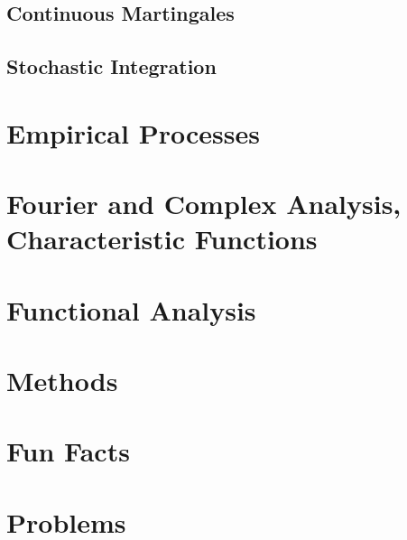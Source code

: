 \documentclass[12pt, oneside]{book}
\begin{document}
        \section{Continuous Martingales}
        \section{Stochastic Integration}
    \chapter{Empirical Processes}
    \appendix
    \chapter{Fourier and Complex Analysis, Characteristic Functions}
    \chapter{Functional Analysis}
    \chapter{Methods}
    \chapter{Fun Facts}
    \chapter{Problems}
\end{document}
